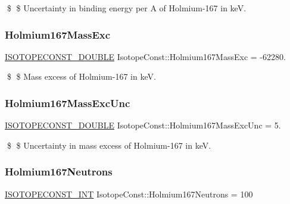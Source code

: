 \$ \$ Uncertainty in binding energy per A of Holmium-\/167 in keV. \mbox{\label{group___isotope_const-_holmium-_ho167_ga9f184f576cce2558b4656512867b4fdc}} 
\subsubsection{\texorpdfstring{Holmium167\+Mass\+Exc}{Holmium167MassExc}}
{\footnotesize\ttfamily \mbox{\hyperlink{group___isotope_const-_macros_ga8f45a7272ce02c0b4c65c44636ed719a}{I\+S\+O\+T\+O\+P\+E\+C\+O\+N\+S\+T\+\_\+\+D\+O\+U\+B\+LE}} Isotope\+Const\+::\+Holmium167\+Mass\+Exc = -\/62280.}

\$ \$ Mass excess of Holmium-\/167 in keV. \mbox{\label{group___isotope_const-_holmium-_ho167_ga4e5f99f06edbf848e4c4705d29bfa07f}} 
\subsubsection{\texorpdfstring{Holmium167\+Mass\+Exc\+Unc}{Holmium167MassExcUnc}}
{\footnotesize\ttfamily \mbox{\hyperlink{group___isotope_const-_macros_ga8f45a7272ce02c0b4c65c44636ed719a}{I\+S\+O\+T\+O\+P\+E\+C\+O\+N\+S\+T\+\_\+\+D\+O\+U\+B\+LE}} Isotope\+Const\+::\+Holmium167\+Mass\+Exc\+Unc = 5.}

\$ \$ Uncertainty in mass excess of Holmium-\/167 in keV. \mbox{\label{group___isotope_const-_holmium-_ho167_gab5bdddb60fe92feeaca56454853a9e44}} 
\subsubsection{\texorpdfstring{Holmium167\+Neutrons}{Holmium167Neutrons}}
{\footnotesize\ttfamily \mbox{\hyperlink{group___isotope_const-_macros_ga5f18360b3e99483a35c32d789e62621c}{I\+S\+O\+T\+O\+P\+E\+C\+O\+N\+S\+T\+\_\+\+I\+NT}} Isotope\+Const\+::\+Holmium167\+Neutrons = 100}

